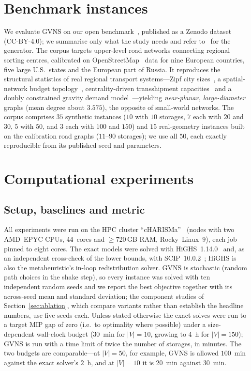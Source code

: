 \documentclass[runningheads]{llncs}
\begin{document}
\section{Benchmark instances}
\label{sec:data}

We evaluate GVNS on our open benchmark~\cite{benchmark,benchmark-data}, published
as a Zenodo dataset (CC-BY-4.0); we summarise only what the study needs and refer
to~\cite{benchmark} for the generator. The corpus targets upper-level road networks
connecting regional sorting centres, calibrated on OpenStreetMap~\cite{osm} data
for nine European countries, five large U.S.\ states and the European part of
Russia. It reproduces the structural statistics of real regional transport
systems---Zipf city sizes~\cite{gabaix1999}, a spatial-network budget
topology~\cite{gastner2006}, centrality-driven transshipment
capacities~\cite{barthelemy2011,kirkley2018} and a doubly constrained gravity
demand model~\cite{wilson1967}---yielding \emph{near-planar, large-diameter} graphs
(mean degree about $3.575$), the opposite of small-world networks.
The corpus comprises $35$ synthetic instances ($10$ with $10$ storages, $7$ each
with $20$ and $30$, $5$ with $50$, and $3$ each with $100$ and $150$) and $15$
real-geometry instances built on the calibration road graphs ($11$--$90$
storages); we use all $50$, each exactly reproducible from its published seed and
parameters.

\section{Computational experiments}
\label{sec:experiments}

\subsection{Setup, baselines and metric}
All experiments were run on the HPC cluster ``cHARISMa''~\cite{charisma} (nodes
with two AMD~EPYC CPUs, 44~cores and $\ge$720\,GB RAM, Rocky~Linux~9), each job
pinned to eight cores. The exact models were solved with HiGHS~1.14.0~\cite{highs}
and, as an independent cross-check of the lower bounds, with
SCIP~10.0.2~\cite{scip}; HiGHS is also the metaheuristic's in-loop redistribution
solver. GVNS is stochastic (random path
choices in the shake step), so every instance was solved with ten independent
random seeds and we report the best objective together with its across-seed
mean and standard deviation; the component studies of
Section~\ref{sec:ablation}, which compare variants rather than establish the
headline numbers, use five seeds each. Unless stated otherwise the exact solves were run
to a target MIP gap of zero (i.e.\ to optimality where possible) under
a size-dependent wall-clock budget (30~min for $|V|=10$, growing to 4~h for
$|V|=150$); GVNS is run with a time limit of twice the number of storages, in
minutes. The two budgets are comparable---at $|V|=50$, for example, GVNS is
allowed $100$~min against the exact solver's $2$~h, and at $|V|=10$ it is
$20$~min against $30$~min.
\end{document}
